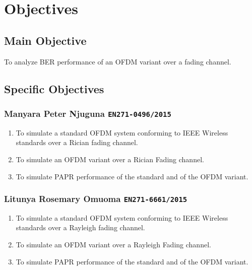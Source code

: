 
\section{Objectives}

\subsection{Main Objective}
To analyze \gls{BER} performance of an \gls{OFDM} variant over a fading channel.

\subsection{Specific Objectives}


\subsubsection{Manyara Peter Njuguna \texttt{EN271-0496/2015}}
\begin{enumerate}[label=\roman*.]
	\item To simulate a standard \gls{OFDM} system conforming to IEEE Wireless standards over a Rician fading channel. 
	\item To simulate an \gls{OFDM} variant over a Rician Fading channel.
	\item To simulate \gls{PAPR} performance of the standard and of the \gls{OFDM} variant.
\end{enumerate}

\subsubsection{Litunya Rosemary Omuoma \texttt{EN271-6661/2015}}
\begin{enumerate}[label=\roman*.]
	\item To simulate a standard \gls{OFDM} system conforming to IEEE Wireless standards over a Rayleigh fading channel.
	\item To simulate an \gls{OFDM} variant over a Rayleigh Fading channel.
	\item To simulate \gls{PAPR} performance of the standard and of the \gls{OFDM} variant.
\end{enumerate}
